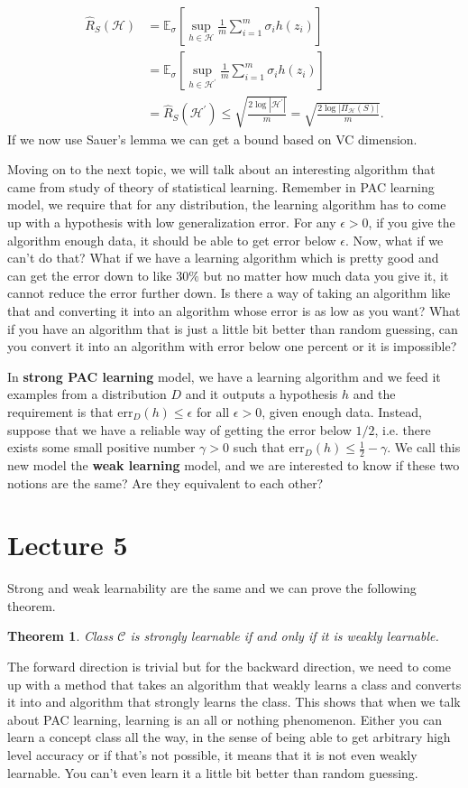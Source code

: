 \documentclass[10pt ]{article}
\newtheorem{thm}{Theorem}
\begin{document}
\begin{align}
\widehat{R}_S({\mathcal{H}}) &= \mathbb{E}_{\sigma} \left[ \sup_{h \in \mathcal{H}} \frac{1}{m} \sum_{i=1}^m \sigma_i h(z_i) \right] \nonumber \\
&=  \mathbb{E}_{\sigma} \left[ \sup_{h \in \mathcal{H}^{\prime}} \frac{1}{m} \sum_{i=1}^m \sigma_i h(z_i) \right] \nonumber \\
&= \widehat{R}_S({\mathcal{H}^{\prime}}) \le \sqrt{\frac{2 \log |\mathcal{H}^{\prime}|}{m}} = \sqrt{\frac{2 \log |\Pi_{\mathcal{H}}(S)|}{m}}. 
\end{align}
If we now use Sauer's lemma we can get a bound based on VC dimension. 

Moving on to the next topic, we will talk about an interesting algorithm that came from study of theory of statistical learning. Remember in PAC learning model, we require that for any distribution, the learning algorithm has to come up with a hypothesis with low generalization error. For any $\epsilon > 0$, if you give the algorithm enough data, it should be able to get error below $\epsilon$. Now, what if we can't do that? What if we have a learning algorithm which is pretty good and can get the error down to like $30\%$ but no matter how much data you give it, it cannot reduce the error further down. Is there a way of taking an algorithm like that and converting it into an algorithm whose error is as low as you want? What if you have an algorithm that is just a little bit better than random guessing, can you convert it into an algorithm with error below one percent or it is impossible?

In \textbf{strong PAC learning} model, we have a learning algorithm and we feed it examples from a distribution $D$ and it outputs a hypothesis $h$ and the requirement is that $\mathrm{err}_D(h) \le  \epsilon$ for all $\epsilon >0$, given enough data. Instead, suppose that we have a reliable way of getting the error below $1/2$, i.e. there exists some  small positive number $\gamma >0$ such that  $\mathrm{err}_D(h) \le  \frac{1}{2}- \gamma$. We call this new model the  \textbf{weak learning} model, and we are interested to know if these two notions are the same? Are they equivalent to each other? 

\section*{Lecture 5}
Strong and weak learnability are the same and we can prove the following theorem. 
\begin{thm}
{\em 
Class $\mathcal{C}$ is strongly learnable if and only if it is weakly learnable. 
}\label{thm_strong_weak_same}
\end{thm}
The forward direction is trivial but for the backward direction, we need to come up with a method that takes an algorithm that weakly learns a class and converts it into and algorithm that strongly learns the class. This shows that when we talk about PAC learning, learning is an all or nothing phenomenon. Either you can learn a concept class all the way, in the sense of being able to get arbitrary high level accuracy or if that's not possible, it means that it is not even weakly learnable. You can't even learn it a little bit better than random guessing. 
\end{document}
